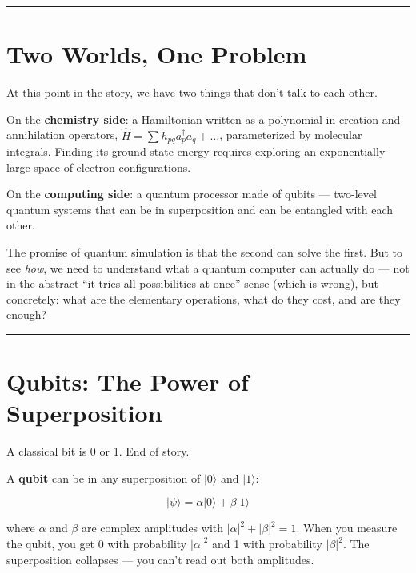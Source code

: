 \documentclass[
  11pt,
  oneside]{book}
\begin{document}
\begin{center}\rule{0.5\linewidth}{0.5pt}\end{center}

\section{Two Worlds, One Problem}\label{two-worlds-one-problem}

At this point in the story, we have two things that don't talk to each
other.

On the \textbf{chemistry side}: a Hamiltonian written as a polynomial in
creation and annihilation operators,
\(\hat{H} = \sum h_{pq} a_p^\dagger a_q + \ldots\), parameterized by
molecular integrals. Finding its ground-state energy requires exploring
an exponentially large space of electron configurations.

On the \textbf{computing side}: a quantum processor made of qubits ---
two-level quantum systems that can be in superposition and can be
entangled with each other.

The promise of quantum simulation is that the second can solve the
first. But to see \emph{how}, we need to understand what a quantum
computer can actually do --- not in the abstract ``it tries all
possibilities at once'' sense (which is wrong), but concretely: what are
the elementary operations, what do they cost, and are they enough?

\begin{center}\rule{0.5\linewidth}{0.5pt}\end{center}

\section{Qubits: The Power of
Superposition}\label{qubits-the-power-of-superposition}

A classical bit is 0 or 1. End of story.

A \textbf{qubit} can be in any superposition of \(\lvert 0\rangle\) and
\(\lvert 1\rangle\):

\[\lvert\psi\rangle = \alpha\lvert 0\rangle + \beta\lvert 1\rangle\]

where \(\alpha\) and \(\beta\) are complex amplitudes with
\(\lvert\alpha\rvert^2 + \lvert\beta\rvert^2 = 1\). When you measure the
qubit, you get 0 with probability \(\lvert\alpha\rvert^2\) and 1 with
probability \(\lvert\beta\rvert^2\). The superposition collapses --- you
can't read out both amplitudes.
\end{document}
